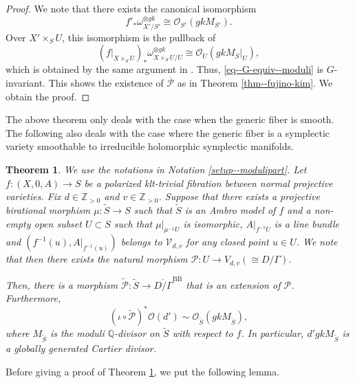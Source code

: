\documentclass[12pt,twoside]{amsart}
\newtheorem{thm}{Theorem}[section]
\theoremstyle{definition}
\begin{document}
\begin{proof}
We note that there exists the canonical isomorphism 
\begin{equation*}\tag{$*\!*\!*$}\label{eq--G-equiv--moduli}
    f'_*\omega_{X'/S'}^{\otimes gk}\cong \mathcal{O}_{S'}(gkM_{S'}).
\end{equation*}
Over $X'\times_SU$, this isomorphism is the pullback of $$(f|_{X\times_SU})_*\omega_{X\times_SU/U}^{\otimes gk}\cong \mathcal{O}_{U}(gkM_{S}|_{U}),$$
which is obtained by the same argument in \cite[2.21]{fujino--canonical-certain}.
Thus, \eqref{eq--G-equiv--moduli} is $G$-invariant.
This shows the existence of $\overline{\mathcal{P}}$ as in Theorem \ref{thm--fujino-kim}. 
We obtain the proof.
\end{proof}


The above theorem only deals with the case when the generic fiber is smooth.
The following also deals with the case where the generic fiber is a symplectic variety smoothable to irreducible holomorphic symplectic manifolds.



\begin{thm}\label{thm--Fujino--moduli}
We use the notations in Notation \ref{setup--modulipart}.
Let $f\colon (X,0,A)\to S$ be a polarized klt-trivial fibration between normal projective varieties.
Fix $d\in\mathbb{Z}_{>0}$ and $v\in\mathbb{Z}_{>0}$.
Suppose that there exists a projective birational morphism $\mu\colon \tilde{S}\to S$ such that $\tilde{S}$ is an Ambro model of $f$ and a non-empty open subset $U\subset S$ such that $\mu|_{\mu^{-1}U}$ is isomorphic, $A|_{f^{-1}U}$ is a line bundle and $(f^{-1}(u),A|_{f^{-1}(u)})$ belongs to $\mathcal{V}_{d,v}$ for any closed point $u\in U$.
We note that then there exists the natural morphism $\mathcal{P}\colon U\to V_{d,v}(\cong D/\Gamma)$.



Then, there is a morphism $\widetilde{\mathcal{P}}\colon\tilde{S}\to \overline{D/\Gamma}^{\mathrm{BB}}$ that is an extension of $\mathcal{P}$.
Furthermore, \begin{equation*}
(\iota\circ\widetilde{\mathcal{P}})^*\mathcal{O}(d')\sim \mathcal{O}_{\tilde{S}}(gkM_{\tilde{S}}),
\end{equation*}
where $M_{\tilde{S}}$ is the moduli $\mathbb{Q}$-divisor on $\tilde{S}$ with respect to $f$.
In particular, $d'gkM_{\tilde{S}}$ is a globally generated Cartier divisor.
\end{thm}

Before giving a proof of Theorem \ref{thm--Fujino--moduli}, we put the following lemma.
\end{document}
